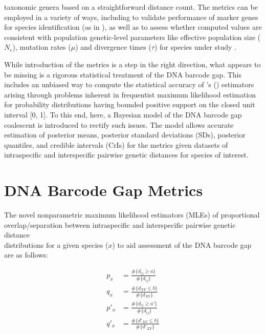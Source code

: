 \documentclass[12pt]{article}
\begin{document}
taxonomic genera based on a straightforward distance count. The metrics can be employed in a variety of ways, including to validate performance of marker genes for species identification (as in \citet{phillips2024measure}), as well as to assess whether computed values are consistent with population genetic-level parameters like effective population size ($N_e$), mutation rates ($\mu$) and divergence times ($\tau$) for species under study \citep{mather2019practical}. 

While introduction of the metrics is a step in the right direction, what appears to be missing is a rigorous statistical treatment of the DNA barcode gap. This includes an unbiased way to compute the statistical accuracy of \citeauthor{phillips2024measure}'s (\citeyear{phillips2024measure}) estimators arising through problems inherent in frequentist maximum likelihood estimation for probability distributions having bounded positive support on the closed unit interval [0, 1]. To this end, here, a Bayesian model of the DNA barcode gap coalescent is introduced to rectify such issues. The model allows accurate estimation of posterior means, posterior standard deviations (SDs), posterior quantiles, and credible intervals (CrIs) for the metrics given datasets of intraspecific and interspecific pairwise genetic distances for species of interest.


\section{DNA Barcode Gap Metrics}

The novel nonparametric maximum likelihood estimators (MLEs) of proportional \\ overlap/separation between intraspecific and interspecific pairwise genetic distance \\ distributions for a given species ($x$) to aid assessment of the DNA barcode gap are as follows:

\begin{align}
p_x &= \frac{\#\{d_{ij} \geq a\}}{\#\{d_{ij}\}} \\[1mm]
q_x &= \frac{\#\{d_{XY} \leq b\}}{\#\{d_{XY}\}} \\[1mm]
p'_x &= \frac{\#\{d_{ij} \geq a'\}}{\#\{d_{ij}\}} \\[1mm]
q'_x &= \frac{\#\{d'_{XY} \leq b\}}{\#\{d'_{XY}\}}
\end{align}
\end{document}
